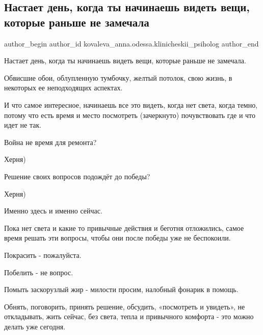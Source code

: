  
 
 
 
 

\subsection{Настает день, когда ты начинаешь видеть вещи, которые раньше не замечала}
\label{sec:02_12_2022.fb.kovaleva_anna.odessa.klinicheskii_psiholog.2.nastaet_den__kogda_t}

\ifcmt
 author_begin
   author_id kovaleva_anna.odessa.klinicheskii_psiholog
 author_end
\fi

Настает день, когда ты начинаешь видеть вещи, которые раньше не замечала.

Обвисшие обои, облупленную тумбочку, желтый потолок, свою жизнь, в некоторых ее
неподходящих аспектах.

И что самое интересное, начинаешь все это видеть, когда нет света, когда темно,
потому что есть время и место посмотреть (зачеркнуто) почувствовать где и что
идет не так.

Война не время для ремонта?

Херня)

Решение своих вопросов подождёт до победы?

Херня)

Именно здесь и именно сейчас.

Пока нет света и какие то привычные действия и беготня отложились, самое время
решать эти вопросы, чтобы они после победы уже не беспокоили.

Покрасить - пожалуйста.

Побелить - не вопрос.

Помыть заскорузлый жир - милости просим, налобный фонарик в помощь.

Обнять, поговорить, принять решение, обсудить, «посмотреть и увидеть», не
откладывать, жить сейчас, без света, тепла и привычного комфорта - это можно
делать уже сегодня.

